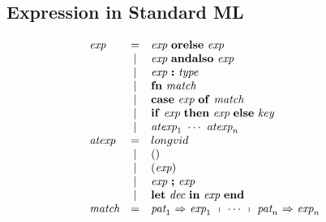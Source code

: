 \documentclass[11pt,a4paper]{article}
\newcommand{\key}[1]{\textrm{\textbf{#1}}}
\newcommand{\prodlhs}[1]{\textit{#1}}
\begin{document}
\subsection {Expression in Standard ML}
{\renewcommand{\arraystretch}{1.2}\[
\begin{array}{lcll}
\prodlhs{exp}
    & = & \prodlhs{exp}\ \key{orelse}\ \prodlhs{exp}                                &\\
    & | & \prodlhs{exp}\ \key{andalso}\ \prodlhs{exp}                               &\\
    & | & \prodlhs{exp}\ \key{:}\ \prodlhs{type}                                    &\\
    & | & \key{fn}\ \prodlhs{match}                                                 &\\
    & | & \key{case}\ \prodlhs{exp}\ \key{of}\ \prodlhs{match}                      &\\
    & | & \key{if}\ \prodlhs{exp}\ \key{then}\ \prodlhs{exp}\ \key{else}\ \prodlhs{key} &\\
    & | & \prodlhs{atexp}_1\ \cdots\ \prodlhs{atexp}_n                              &\\
\prodlhs{atexp}
    & = & longvid                                                                   &\\
    & | & ()                                                                        &\\
    & | & (\prodlhs{exp})                                                           &\\
    & | & \prodlhs{exp}\ \key{;}\ \prodlhs{exp}                                     &\\
    & | & \key{let}\ \prodlhs{dec}\ \key{in}\ \prodlhs{exp}\ \key{end}              &\\
\prodlhs{match}
    & = & \prodlhs{pat}_1\ \key{$\Rightarrow$}\ \prodlhs{exp}_1\ \shortmid\ \cdots\ \shortmid\ \prodlhs{pat}_n\ \key{$\Rightarrow$}\ \prodlhs{exp}_n & \\
\end{array}
\]}
\end{document}
